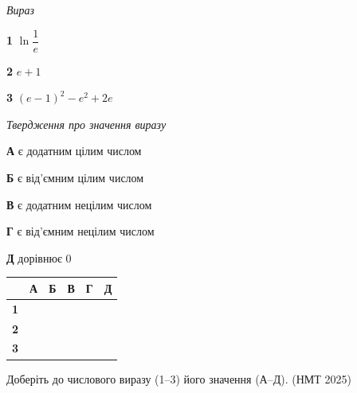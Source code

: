 \documentclass[14pt]{extarticle}
\newcommand{\matchTable}{
\begin{tabular}{|>{\centering\arraybackslash}p{0.25cm}|*{5}{>{\centering\arraybackslash}p{0.25cm}|}}
\hline
& \scriptsize\textbf{А} & \scriptsize\textbf{Б} & \scriptsize\textbf{В} & \scriptsize\textbf{Г} & \scriptsize\textbf{Д} \\
\hline
\scriptsize\textbf{1} & \rule{0pt}{0.25cm} & & & & \\
\hline
\scriptsize\textbf{2} & \rule{0pt}{0.25cm} & & & & \\
\hline
\scriptsize\textbf{3} & \rule{0pt}{0.25cm} & & & & \\
\hline
\end{tabular}
}
\newcommand{\task}[2]{\noindent\makebox[1.5em][l]{\textbf{#1.}}\parbox[t]{\dimexpr\textwidth-1.5em}{#2}}
\newcommand{\nmtyear}[1]{\hfill{\small\color{yearcolor}(НМТ #1)}}
\begin{document}
\vspace{0.3cm}
\noindent
\begin{minipage}[t]{0.28\textwidth}
\vspace{0pt}
\textit{Вираз}

\vspace{0.2cm}
\textbf{1} \quad $\ln\dfrac{1}{e}$

\vspace{0.2cm}
\textbf{2} \quad $e + 1$

\vspace{0.2cm}
\textbf{3} \quad $(e - 1)^2 - e^2 + 2e$
\end{minipage}
\hfill
\begin{minipage}[t]{0.45\textwidth}
\vspace{0pt}
\textit{Твердження про значення виразу}

\vspace{0.2cm}
\textbf{А} \quad є додатним цілим числом

\vspace{0.2cm}
\textbf{Б} \quad є від'ємним цілим числом

\vspace{0.2cm}
\textbf{В} \quad є додатним нецілим числом

\vspace{0.2cm}
\textbf{Г} \quad є від'ємним нецілим числом

\vspace{0.2cm}
\textbf{Д} \quad дорівнює 0
\end{minipage}
\hfill
\begin{minipage}[t]{0.18\textwidth}
\vspace{0pt}
\matchTable
\end{minipage}

\vspace{0.7cm}

\task{28}{Доберіть до числового виразу (1--3) його значення (А--Д). \nmtyear{2025}}
\end{document}
